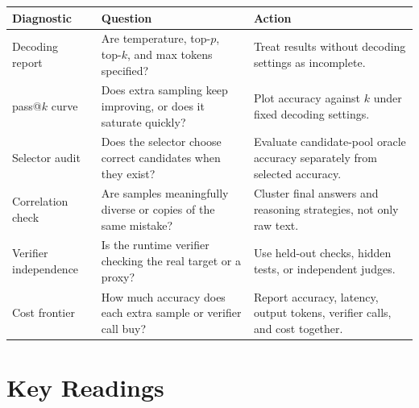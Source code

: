\begin{center}
\small
\begin{tabularx}{\textwidth}{@{}p{3.7cm}p{5cm}X@{}}
\toprule
\textbf{Diagnostic} & \textbf{Question} & \textbf{Action} \\
\midrule
Decoding report & Are temperature, top-$p$, top-$k$, and max tokens specified? & Treat results without decoding settings as incomplete. \\
pass@$k$ curve & Does extra sampling keep improving, or does it saturate quickly? & Plot accuracy against $k$ under fixed decoding settings. \\
Selector audit & Does the selector choose correct candidates when they exist? & Evaluate candidate-pool oracle accuracy separately from selected accuracy. \\
Correlation check & Are samples meaningfully diverse or copies of the same mistake? & Cluster final answers and reasoning strategies, not only raw text. \\
Verifier independence & Is the runtime verifier checking the real target or a proxy? & Use held-out checks, hidden tests, or independent judges. \\
Cost frontier & How much accuracy does each extra sample or verifier call buy? & Report accuracy, latency, output tokens, verifier calls, and cost together. \\
\bottomrule
\end{tabularx}
\normalsize
\end{center}


\section*{Key Readings}

